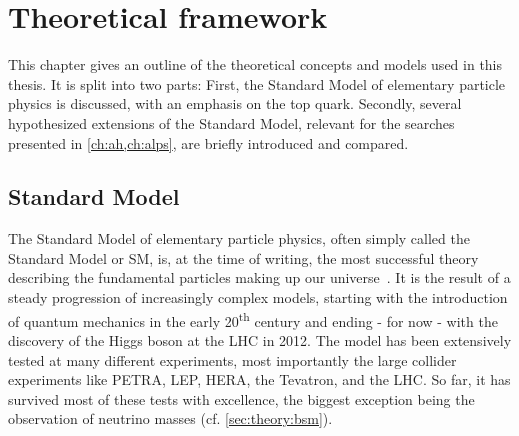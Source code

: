 \chapter{Theoretical framework}
\label{ch:theory}

This chapter gives an outline of the theoretical concepts and models used in this thesis. It is split into two parts: First, the Standard Model of elementary particle physics is discussed, with an emphasis on the top quark. Secondly, several hypothesized extensions of the Standard Model, relevant for the searches presented in \cref{ch:ah,ch:alps}, are briefly introduced and compared.

\section{Standard Model}


The Standard Model of elementary particle physics, often simply called the Standard Model or SM, is, at the time of writing, the most successful theory describing the fundamental particles making up our universe~\cite{Martin:2008zz,Schwartz:2014sze}. It is the result of a steady progression of increasingly complex models, starting with the introduction of quantum mechanics in the early 20\textsuperscript{th} century and ending - for now - with the discovery of the Higgs boson at the LHC in 2012. The model has been extensively tested at many different experiments, most importantly the large collider experiments like PETRA, LEP, HERA, the Tevatron, and the LHC. So far, it has survived most of these tests with excellence, the biggest exception being the observation of neutrino masses (cf. \cref{sec:theory:bsm}).

